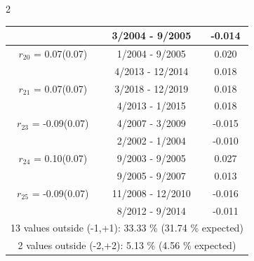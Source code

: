 \begin{multicols}{2}
{\begin{tabular}{ccc}
  &        3/2004 -  9/2005 &       -0.014  \vspace{-.02in}   \\ \hline 
    $r_{20}$ = 0.07(0.07) &       1/2004 -  9/2005 &        0.020   \vspace{-.10in} \\  
&        4/2013 - 12/2014 &        0.018  \vspace{-.02in} \\ \hline 
  $r_{21}$ = 0.07(0.07) &       3/2018 - 12/2019 &        0.018   \vspace{-.10in} \\  
&        4/2013 -  1/2015 &        0.018  \vspace{-.02in} \\ \hline 
  $r_{23}$ = -0.09(0.07) &       4/2007 -  3/2009 &       -0.015    \vspace{-.10in} \\ 
  &        2/2002 -  1/2004 &       -0.010  \vspace{-.02in}   \\ \hline 
    $r_{24}$ = 0.10(0.07) &       9/2003 -  9/2005 &        0.027   \vspace{-.10in} \\  
&        9/2005 -  9/2007 &        0.013  \vspace{-.02in} \\ \hline 
  $r_{25}$ = -0.09(0.07) &      11/2008 - 12/2010 &       -0.016    \vspace{-.10in} \\ 
  &        8/2012 -  9/2014 &       -0.011  \vspace{-.02in}   \\ \hline 
  \multicolumn{3}{c}{              13 values outside (-1,+1): 33.33  \% (31.74  \% expected)}\vspace{-.10in} \\ 
\multicolumn{3}{c}{               2 values outside (-2,+2):  5.13 \%  (4.56 \% expected) } \\
 \end{tabular} \\ 
 } 
\end{multicols} 

